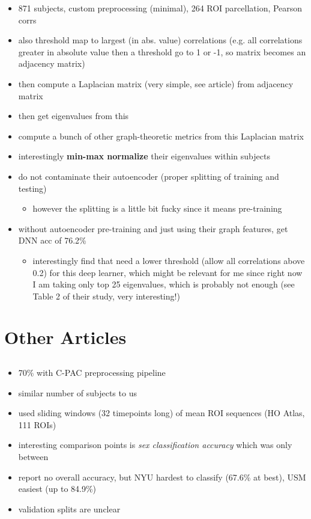 \documentclass[10pt]{article}
\begin{document}
\begin{itemize}
  \item 871 subjects, custom preprocessing (minimal), 264 ROI parcellation, Pearson corrs
  \item also threshold map to largest (in abs. value) correlations (e.g. all correlations greater in
  absolute value then a threshold go to 1 or -1, so matrix becomes an adjacency matrix)
  \item then compute a Laplacian matrix (very simple, see article) from adjacency matrix
  \item then get eigenvalues from this
  \item compute a bunch of other graph-theoretic metrics from this Laplacian matrix
  \item interestingly \textbf{min-max normalize} their eigenvalues within subjects
  \item do not contaminate their autoencoder (proper splitting of training and testing)
  \begin{itemize}
    \item however the splitting is a little bit fucky since it means pre-training
  \end{itemize}
  \item without autoencoder pre-training and just using their graph features, get DNN acc of 76.2\%
  \begin{itemize}
    \item interestingly find that need a lower threshold (allow all correlations above 0.2) for this
    deep learner, which might be relevant for me since right now I am taking only top 25
    eigenvalues, which is probably not enough (see Table 2 of their study, very interesting!)
  \end{itemize}
\end{itemize}

\section{Other Articles} \label{other-articles}


\subsection{\citet{liMultisiteFMRIAnalysis2020}}

\begin{itemize}
  \item 70\% with C-PAC preprocessing pipeline
  \item similar number of subjects to us
  \item used sliding windows (32 timepoints long) of mean ROI sequences (HO Atlas, 111 ROIs)
  \item interesting comparison points is \emph{sex classification accuracy} which was only between
  \item report no overall accuracy, but NYU hardest to classify (67.6\% at best), USM easiest (up to
  84.9\%)
  \item validation splits are unclear
\end{itemize}
\end{document}
